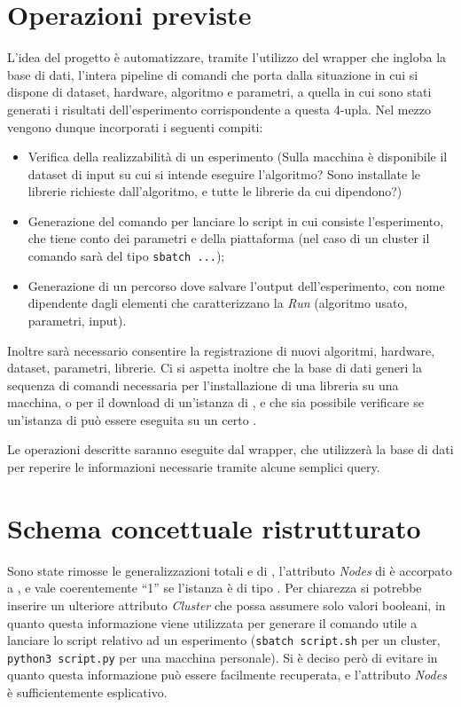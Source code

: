 \documentclass{article}
\begin{document}
\section{Operazioni previste}
L'idea del progetto è automatizzare, tramite l'utilizzo del wrapper che ingloba la base di dati, l'intera pipeline di comandi che porta dalla situazione in cui si dispone di dataset, hardware, algoritmo e parametri, a quella in cui sono stati generati i risultati dell'esperimento corrispondente a questa 4-upla. Nel mezzo vengono dunque incorporati i seguenti compiti:
\begin{itemize}
    \item Verifica della realizzabilità di un esperimento (Sulla macchina è disponibile il dataset di input su cui si intende eseguire l'algoritmo? Sono installate le librerie richieste dall'algoritmo, e tutte le librerie da cui dipendono?)
    \item Generazione del comando per lanciare lo script in cui consiste l'esperimento, che tiene conto dei parametri e della piattaforma (nel caso di un cluster il comando sarà del tipo \texttt{sbatch ...});
    \item Generazione di un percorso dove salvare l'output dell'esperimento, con nome dipendente dagli elementi che caratterizzano la \emph{Run} (algoritmo usato, parametri, input).
\end{itemize}
Inoltre sarà necessario consentire la registrazione di nuovi algoritmi, hardware, dataset, parametri, librerie. Ci si aspetta inoltre che la base di dati generi la sequenza di comandi necessaria per l'installazione di una libreria su una macchina, o per il download di un'istanza di , e che sia possibile verificare se un'istanza di  può essere eseguita su un certo .

Le operazioni descritte saranno eseguite dal wrapper, che utilizzerà la base di dati per reperire le informazioni necessarie tramite alcune semplici query.

\section{Schema concettuale ristrutturato}
Sono state rimosse le generalizzazioni totali  e  di , l'attributo \emph{Nodes} di  è accorpato a , e vale coerentemente ``1'' se l'istanza è di tipo . Per chiarezza si potrebbe inserire un ulteriore attributo \emph{Cluster} che possa assumere solo valori booleani, in quanto questa informazione viene utilizzata per generare il comando utile a lanciare lo script relativo ad un esperimento (\texttt{sbatch script.sh} per un cluster, \texttt{python3 script.py} per una macchina personale). Si è deciso però di evitare in quanto questa informazione può essere facilmente recuperata, e l'attributo \emph{Nodes} è sufficientemente esplicativo.
\end{document}
